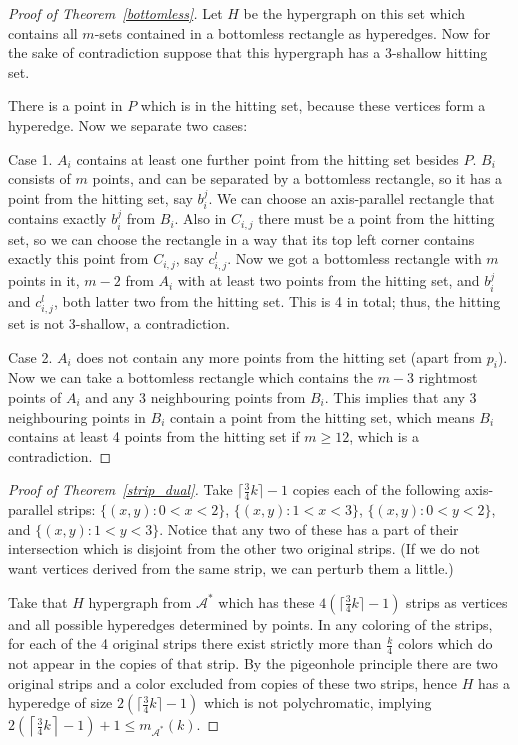 \documentclass[11pt,oneside]{amsart}
\newcommand{\A}{\mathcal{A}}
\begin{document}
\begin{proof} [Proof of Theorem~\ref{bottomless}]
Let $H$ be the hypergraph on this set which contains all $m$-sets contained in a bottomless rectangle as hyperedges. Now for the sake of contradiction suppose that this hypergraph has a 3-shallow hitting set.

There is a point in $P$ which is in the hitting set, because these vertices form a hyperedge. Now we separate two cases:

Case 1. $A_i$ contains at least one further point from the hitting set besides $P$. $B_i$ consists of $m$ points, and can be separated by a bottomless rectangle, so it has a point from the hitting set, say $b_i^j$. We can choose an axis-parallel rectangle that contains exactly $b_i^j$ from $B_i$. Also in $C_{i,j}$ there must be a point from the hitting set, so we can choose the rectangle in a way that its top left corner contains exactly this point from $C_{i,j}$, say $c_{i,j}^l$. Now we got a bottomless rectangle with $m$ points in it, $m-2$ from $A_i$ with at least two points from the hitting set, and $b_i^j$ and $c_{i,j}^l$, both latter two from the hitting set. This is 4 in total; thus, the hitting set is not 3-shallow, a contradiction.



Case 2. $A_i$ does not contain any more points from the hitting set (apart from $p_i$). Now we can take a bottomless rectangle which contains the $m-3$ rightmost points of $A_i$ and any 3 neighbouring points from $B_i$. This implies that any 3 neighbouring points in $B_i$ contain a point from the hitting set, which means $B_i$ contains at least 4 points from the hitting set if $m\ge12$, which is a contradiction.
\end{proof}

\begin{proof}[Proof of Theorem~\ref{strip_dual}]

Take $\lceil \frac{3}{4}k\rceil-1$ copies each of the following axis-parallel strips: $\{(x,y):0<x<2\}$, $\{(x,y):1<x<3\}$, $\{(x,y):0<y<2\}$, and $\{(x,y):1<y<3\}$. Notice that any two of these has a part of their intersection which is disjoint from the other two original strips. (If we do not want vertices derived from the same strip, we can perturb them a little.)

Take that $H$ hypergraph from $\A^*$ which has these $4(\lceil \frac{3}{4}k\rceil-1)$ strips as vertices and all possible hyperedges determined by points. In any coloring of the strips, for each of the 4 original strips there exist strictly more than $\frac{k}{4}$ colors which do not appear in the copies of that strip. By the pigeonhole principle there are two original strips and a color excluded from copies of these two strips, hence $H$ has a hyperedge of size $2(\lceil \frac{3}{4}k\rceil-1)$ which is not polychromatic, implying $2\left(\left\lceil \frac{3}{4}k\right\rceil -1\right) + 1 \leq m_{\A^*}(k)$.
\end{proof}
\end{document}
